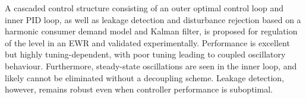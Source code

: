 A cascaded control structure consisting of an outer optimal control loop and inner PID loop, as well as leakage detection and disturbance rejection based on a harmonic consumer demand model and Kalman filter, is proposed for regulation of the level in an EWR and validated experimentally. Performance is excellent but highly tuning-dependent, with poor tuning leading to coupled oscillatory behaviour. Furthermore, steady-state oscillations are seen in the inner loop, and likely cannot be eliminated without a decoupling scheme. Leakage detection, however, remains robust even when controller performance is suboptimal.